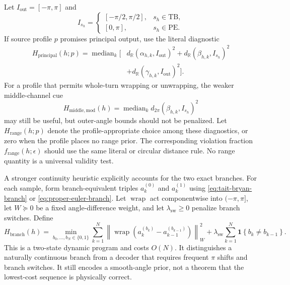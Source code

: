 \documentclass[11pt]{article}
\newcommand{\R}{\mathbb{R}}
\newcommand{\median}{\operatorname{median}}
\newcommand{\wrap}{\operatorname{wrap}}
\newcommand{\TB}{\mathrm{TB}}
\newcommand{\PE}{\mathrm{PE}}
\newcommand{\norm}[1]{\left\lVert #1 \right\rVert}
\newcommand{\set}[1]{\left\{ #1 \right\}}
\begin{document}
    Let $I_{\mathrm{out}}=[-\pi,\pi]$ and
    \begin{equation}
        I_{s_h}=\begin{cases}
                    [-\pi/2,\pi/2], & s_h\in\TB,\\
            [0,\pi], & s_h\in\PE.
        \end{cases}
    \end{equation}
    If source profile $p$ promises principal output, use the literal diagnostic
    \begin{equation}
        \begin{split}
            H_{\mathrm{principal}}(h;p)
            =\median_k\bigl[&d_{\R}(\alpha_{h,k},I_{\mathrm{out}})^2
            +d_{\R}(\beta_{h,k},I_{s_h})^2\\
            &+d_{\R}(\gamma_{h,k},I_{\mathrm{out}})^2\bigr].
            \label{eq:euler-principal-score}
        \end{split}
    \end{equation}
    For a profile that permits whole-turn wrapping or unwrapping, the weaker middle-channel
    cue
    \begin{equation}
        H_{\mathrm{middle,mod}}(h)
        =\median_k d_{2\pi}(\beta_{h,k},I_{s_h})^2
        \label{eq:euler-range-score}
    \end{equation}
    may still be useful, but outer-angle bounds should not be penalized. Let
    $H_{\mathrm{range}}(h;p)$ denote the profile-appropriate choice among these diagnostics,
    or zero when the profile places no range prior. The corresponding violation fraction
    $f_{\mathrm{range}}(h;\epsilon)$ should use the same literal or circular distance rule.
    No range quantity is a universal validity test.

    A stronger continuity heuristic explicitly accounts for the two exact branches. For
    each sample, form branch-equivalent triples $a_k^{(0)}$ and $a_k^{(1)}$ using
    \eqref{eq:tait-bryan-branch} or \eqref{eq:proper-euler-branch}. Let $\wrap$ act
    componentwise into $(-\pi,\pi]$, let $W\succeq0$ be a fixed angle-difference weight,
    and let $\lambda_{\mathrm{sw}}\ge0$ penalize branch switches. Define
    \begin{equation}
        H_{\mathrm{branch}}(h)
        =\min_{b_0,\ldots,b_N\in\{0,1\}}
        \sum_{k=1}^{N}
        \norm{\wrap\!\left(a_k^{(b_k)}-a_{k-1}^{(b_{k-1})}\right)}_{W}^2
        +\lambda_{\mathrm{sw}}
        \sum_{k=1}^{N}\mathbf 1\set{b_k\ne b_{k-1}}.
        \label{eq:euler-branch-dp}
    \end{equation}
    This is a two-state dynamic program and costs $O(N)$. It distinguishes a naturally
    continuous branch from a decoder that requires frequent $\pi$ shifts and branch
    switches. It still encodes a smooth-angle prior, not a theorem that the lowest-cost
    sequence is physically correct.
\end{document}
